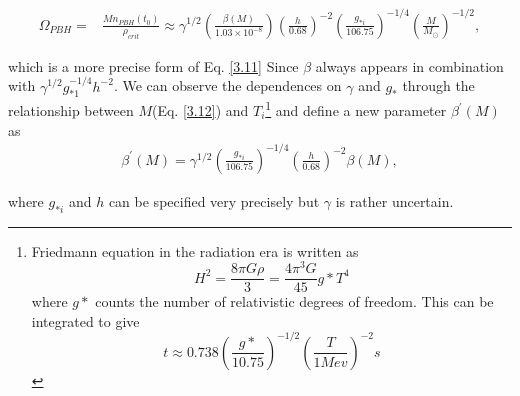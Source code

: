 \begin{align}
    \Omega_{PBH}= &   \frac{M n_{PBH}\left(t_0\right)}{\rho_{crit}} \approx \gamma^{1 / 2} \left(\frac{\beta(M)}{1.03 \times 10^{-8}}\right)\left(\frac{h}{0.68}\right)^{-2} \left(\frac{g_{*i}}{106.75}\right)^{-1 / 4}\left(\frac{M}{M_{\odot}}\right)^{-1 / 2},\label{3.14}
\end{align}

which is a more precise form of Eq. \ref{3.11} Since $\beta$ always appears in combination with $\gamma^{1 / 2} g_{* 1}^{-1 / 4} h^{-2}$. We can observe the dependences on $\gamma$ and $g_{*}$ through the relationship between ${M}$(Eq. \ref{3.12}) and $T_i$\footnote{ Friedmann equation in the radiation era is written as $$ H^2 = \frac{8\pi G \rho}{3} = \frac{4 \pi^3 G}{45} g* T^4 $$ where $g*$ counts the number of relativistic degrees of freedom. This can be integrated to give\\
$$t\approx 0.738 \left(\frac{g*}{10.75} \right)^{-1/2} \left(\frac{T}{1 Mev} \right)^{-2}s $$}
and define a new parameter $ \beta^{\prime}(M)$ as
\begin{align}
    \beta^{\prime}(M)=\gamma^{1 / 2}\left(\frac{g_{*i }}{106.75}\right)^{-1 / 4}\left(\frac{h}{0.68}\right)^{-2} \beta(M),\label{3.15}
\end{align}


where $g_{*i}$ and $h$ can be specified very precisely but $\gamma$ is rather uncertain.

